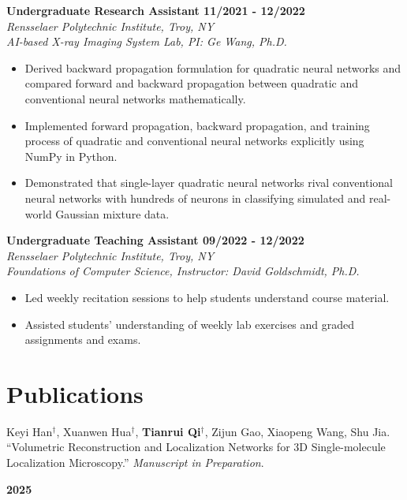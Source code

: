 \documentclass[letterpaper, 11pt]{article}
\newcommand{\subsectionvspace}{\vspace{8pt}}
\begin{document}
    \textbf{Undergraduate Research Assistant \hfill 11/2021 - 12/2022} \\
    \textit{Rensselaer Polytechnic Institute, Troy, NY} \\
    \textit{AI-based X-ray Imaging System Lab, PI: Ge Wang, Ph.D.}
    \begin{itemize}
        \item Derived backward propagation formulation for quadratic neural networks and compared forward and backward propagation between quadratic and conventional neural networks mathematically.
        \item Implemented forward propagation, backward propagation, and training process of quadratic and conventional neural networks explicitly using NumPy in Python.
        \item Demonstrated that single-layer quadratic neural networks rival conventional neural networks with hundreds of neurons in classifying simulated and real-world Gaussian mixture data.
    \end{itemize}

    \subsectionvspace

    \textbf{Undergraduate Teaching Assistant \hfill 09/2022 - 12/2022} \\
    \textit{Rensselaer Polytechnic Institute, Troy, NY} \\
    \textit{Foundations of Computer Science, Instructor: David Goldschmidt, Ph.D.}
    \begin{itemize}
        \item Led weekly recitation sessions to help students understand course material.
        \item Assisted students' understanding of weekly lab exercises and graded assignments and exams.
    \end{itemize}


\section{Publications}


    \begin{minipage}[t]{0.9\textwidth} 
        Keyi Han$^\dag$, Xuanwen Hua$^\dag$, \textbf{Tianrui Qi}$^\dag$, Zijun Gao, Xiaopeng Wang, Shu Jia. 
        ``Volumetric Reconstruction and Localization Networks for 3D Single-molecule Localization Microscopy.''
        \textit{Manuscript in Preparation}.
    \end{minipage}%
    \begin{minipage}[t]{0.1\textwidth} \raggedleft
        \textbf{2025}
    \end{minipage}
\end{document}

